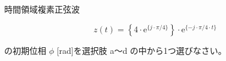 時間領域複素正弦波

\[
z(t) =  \left \{ 4 \cdot \textrm{e}^{\{j \cdot \pi/4 \}} \right \} \cdot \textrm{e}^{\{ -j \cdot \pi/4 \cdot t \}}
\]

\bigskip
\noindent の初期位相 $\phi$ [rad]を選択肢 a〜d の中から1つ選びなさい。

